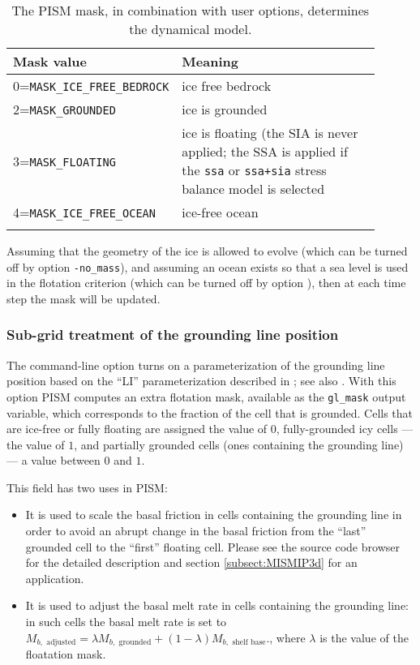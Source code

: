 \begin{table}[ht]
  \centering
 \small
  \begin{tabular}{p{0.25\linewidth}p{0.65\linewidth}}
    \toprule
    \textbf{Mask value} & \textbf{Meaning}\\
    \midrule
    0=\texttt{MASK_ICE_FREE_BEDROCK} & ice free bedrock \\
    2=\texttt{MASK_GROUNDED}& ice is grounded \\
    3=\texttt{MASK_FLOATING} & ice is floating (the SIA is never applied; the SSA is applied if the \texttt{ssa} or \texttt{ssa+sia} stress balance model is selected\\
    4=\texttt{MASK_ICE_FREE_OCEAN} & ice-free ocean \\
    \\\bottomrule
  \end{tabular}
  \normalsize
  \caption{The PISM mask, in combination with user options, determines the dynamical model.}
  \label{tab:maskvals} 
\end{table}

Assuming that the geometry of the ice is allowed to evolve (which can be turned off by option \texttt{-no_mass}), and assuming an ocean exists so that a sea level is used in the flotation criterion (which can be turned off by option ), then at each time step the mask will be updated.

\subsubsection{Sub-grid treatment of the grounding line position}
\label{sec:subgrid-grounding-line}

The command-line option  turns on a parameterization of the grounding line position based on the ``LI'' parameterization described in \cite{Gladstoneetal2010}; see also \cite{Feldmannetal2014}.  With this option PISM computes an extra flotation mask, available as the \texttt{gl_mask} output variable, which corresponds to the fraction of the cell that is grounded. Cells that are ice-free or fully floating are assigned the value of $0$, fully-grounded icy cells --- the value of $1$, and partially grounded cells (ones containing the grounding line) --- a value between $0$ and $1$.

This field has two uses in PISM:
\begin{itemize}
\item It is used to scale the basal friction in cells containing the grounding line in order to avoid an abrupt change in the basal friction from the ``last'' grounded cell to the ``first'' floating cell. Please see the source code browser for the detailed description and section \ref{subsect:MISMIP3d} for an application.
\item It is used to adjust the basal melt rate in cells containing the grounding line: in such cells the basal melt rate is set to $M_{b,\text{ adjusted}} = \lambda M_{b,\text{ grounded}} + (1 - \lambda)M_{b,\text{ shelf base}}.$, where $\lambda$ is the value of the floatation mask.
\end{itemize}

